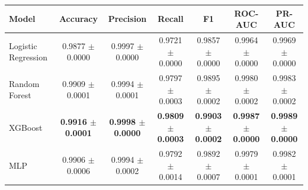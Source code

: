 \begin{tabular}{lcccccc}
\hline
Model & Accuracy & Precision & Recall & F1 & ROC-AUC & PR-AUC \\
\hline
Logistic Regression & 0.9877 $\pm$ 0.0000 & 0.9997 $\pm$ 0.0000 & 0.9721 $\pm$ 0.0000 & 0.9857 $\pm$ 0.0000 & 0.9964 $\pm$ 0.0000 & 0.9969 $\pm$ 0.0000 \\
Random Forest & 0.9909 $\pm$ 0.0001 & 0.9994 $\pm$ 0.0001 & 0.9797 $\pm$ 0.0003 & 0.9895 $\pm$ 0.0002 & 0.9980 $\pm$ 0.0002 & 0.9983 $\pm$ 0.0002 \\
XGBoost & \textbf{0.9916 $\pm$ 0.0001} & \textbf{0.9998 $\pm$ 0.0000} & \textbf{0.9809 $\pm$ 0.0003} & \textbf{0.9903 $\pm$ 0.0002} & \textbf{0.9987 $\pm$ 0.0000} & \textbf{0.9989 $\pm$ 0.0000} \\
MLP & 0.9906 $\pm$ 0.0006 & 0.9994 $\pm$ 0.0002 & 0.9792 $\pm$ 0.0014 & 0.9892 $\pm$ 0.0007 & 0.9979 $\pm$ 0.0001 & 0.9982 $\pm$ 0.0001 \\
\hline
\end{tabular}
